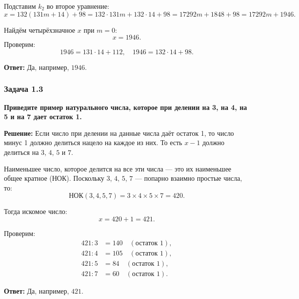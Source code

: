 \documentclass[12pt, a4paper]{article}
\begin{document}
Подставим $k_2$ во второе уравнение:
\[
x = 132(131m + 14) + 98 = 132 \cdot 131m + 132 \cdot 14 + 98 = 17292m + 1848 + 98 = 17292m + 1946.
\]

Найдём четырёхзначное $x$ при $m = 0$:
\[
x = 1946.
\]
Проверим:
\[
1946 = 131 \cdot 14 + 112, \quad 1946 = 132 \cdot 14 + 98.
\]

\textbf{Ответ:} Да, например, $1946$.

\subsubsection*{Задача 1.3}
\textbf{Приведите пример натурального числа, которое при делении на 3, на 4, на 5 и на 7 дает остаток 1.}

\textbf{Решение:}
Если число при делении на данные числа даёт остаток 1, то число минус 1 должно делиться нацело на каждое из них. То есть $x - 1$ должно делиться на $3$, $4$, $5$ и $7$.

Наименьшее число, которое делится на все эти числа — это их наименьшее общее кратное (НОК). Поскольку $3$, $4$, $5$, $7$ — попарно взаимно простые числа, то:
\[
\text{НОК}(3, 4, 5, 7) = 3 \times 4 \times 5 \times 7 = 420.
\]

Тогда искомое число:
\[
x = 420 + 1 = 421.
\]

Проверим:
\begin{align*}
421 : 3 &= 140 \quad (\text{остаток } 1), \\
421 : 4 &= 105 \quad (\text{остаток } 1), \\
421 : 5 &= 84 \quad (\text{остаток } 1), \\
421 : 7 &= 60 \quad (\text{остаток } 1).
\end{align*}

\textbf{Ответ:} Да, например, $421$.
\end{document}
